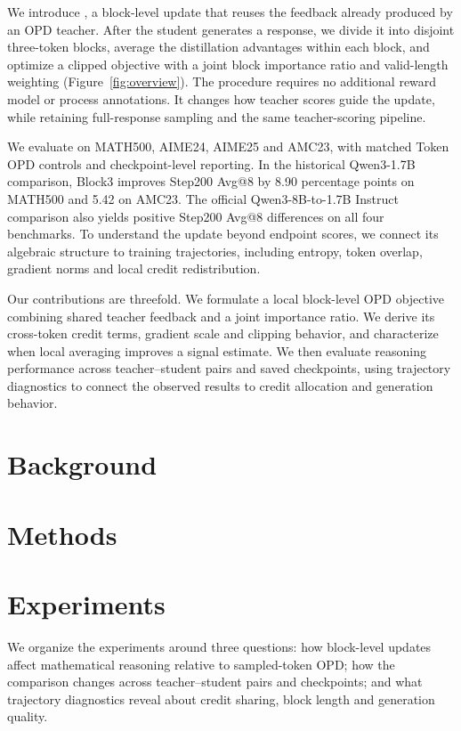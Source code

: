 We introduce \method{}, a block-level update that reuses the feedback already produced by an OPD teacher. After the student generates a response, we divide it into disjoint three-token blocks, average the distillation advantages within each block, and optimize a clipped objective with a joint block importance ratio and valid-length weighting (Figure~\ref{fig:overview}). The procedure requires no additional reward model or process annotations. It changes how teacher scores guide the update, while retaining full-response sampling and the same teacher-scoring pipeline.

We evaluate on MATH500, AIME24, AIME25 and AMC23, with matched Token OPD controls and checkpoint-level reporting. In the historical Qwen3-1.7B comparison, Block3 improves Step200 Avg@8 by 8.90 percentage points on MATH500 and 5.42 on AMC23. The official Qwen3-8B-to-1.7B Instruct comparison also yields positive Step200 Avg@8 differences on all four benchmarks. To understand the update beyond endpoint scores, we connect its algebraic structure to training trajectories, including entropy, token overlap, gradient norms and local credit redistribution.

Our contributions are threefold. We formulate a local block-level OPD objective combining shared teacher feedback and a joint importance ratio. We derive its cross-token credit terms, gradient scale and clipping behavior, and characterize when local averaging improves a signal estimate. We then evaluate reasoning performance across teacher--student pairs and saved checkpoints, using trajectory diagnostics to connect the observed results to credit allocation and generation behavior.

\section{Background}
\label{sec:background}


\section{Methods}
\label{sec:method}


\section{Experiments}
We organize the experiments around three questions: how block-level updates affect mathematical reasoning relative to sampled-token OPD; how the comparison changes across teacher--student pairs and checkpoints; and what trajectory diagnostics reveal about credit sharing, block length and generation quality.

